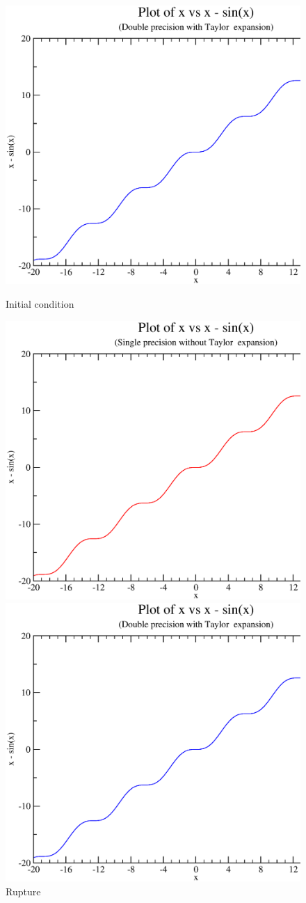 \documentclass{article}
\begin{document}
\begin{figure}[ht] 
  \label{ fig7} 
  \begin{minipage}[b]{0.5\linewidth}
    \centering
    \includegraphics[width=.5\linewidth]{images/a.eps} 
    \caption{Initial condition} 
    \vspace{4ex}
  \end{minipage}%
  \begin{minipage}[b]{0.5\linewidth}
    \centering
    \includegraphics[width=.5\linewidth]{images/b.eps} 
    \caption{Rupture} 
    \vspace{4ex}
  \end{minipage} 
  \begin{minipage}[b]{0.5\linewidth}
    \centering
    \includegraphics[width=.5\linewidth]{images/c.eps} 

\end{minipage}
\end{figure}
\end{document}
